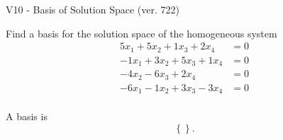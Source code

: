 \begin{exercise}
  \begin{exerciseTitle}V10 - Basis of Solution Space (ver. 722)\end{exerciseTitle}
  \begin{exerciseStatement}
    Find a basis for the solution space of the homogeneous system 
\begin{align*}
 5 x_ 1 + 5 x_ 2 + 1 x_ 3 + 2 x_ 4 &= 0  \\ 
  -1 x_ 1 + 3 x_ 2 + 5 x_ 3 + 1 x_ 4 &= 0  \\ 
  -4 x_ 2 -6 x_ 3 + 2 x_ 4 &= 0  \\ 
  -6 x_ 1 -1 x_ 2 + 3 x_ 3 -3 x_ 4 &= 0  \\ 
 \end{align*}


 
  \end{exerciseStatement}

  \begin{exerciseAnswer}
   A basis is   
\[\left\{\right\}.\]

  


  \end{exerciseAnswer}
\end{exercise}